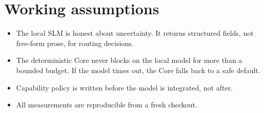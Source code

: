\section{Working assumptions}

\begin{itemize}
  \item The local SLM is honest about uncertainty. It returns
        structured fields, not free-form prose, for routing
        decisions.
  \item The deterministic Core never blocks on the local model for
        more than a bounded budget. If the model times out, the Core
        falls back to a safe default.
  \item Capability policy is written before the model is integrated,
        not after.
  \item All measurements are reproducible from a fresh checkout.
\end{itemize}
